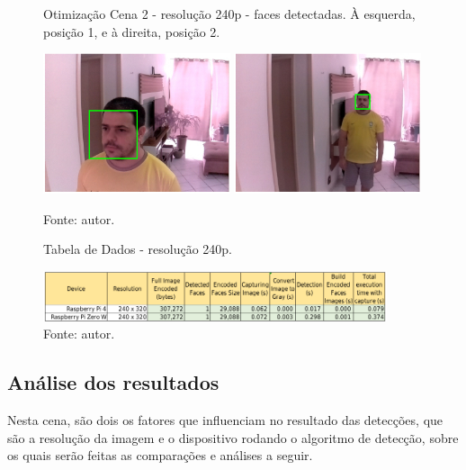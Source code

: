 \begin{figure}[H]
    \centering
    \caption[Otimização Cena 2 - resolução 240p - faces detectadas. À esquerda posição 1 e à direita, posição 2]{Otimização Cena 2 - resolução 240p - faces detectadas. À esquerda, posição 1, e à direita, posição 2.}
    \includegraphics[width=0.49\textwidth]{Cap4_Experimentos_Realizados/Figures/cena2_320x240_pos1_face.jpg}
    \includegraphics[width=0.49\textwidth]{Cap4_Experimentos_Realizados/Figures/cena2_320x240_pos2_face.jpg}
    \caption*{Fonte: autor.}
    \label{fig:otimizacaoCena2_240p_faces}
\end{figure}

\begin{figure}[H]
    \centering
    \caption[Tabela de Dados - resolução 240p.]{Tabela de Dados - resolução 240p.}
    \includegraphics[width=0.90\textwidth]{Cap4_Experimentos_Realizados/Figures/cena2_dados_240p.jpg}
    \caption*{Fonte: autor.}
    \label{fig:dadosCena2_240p}
\end{figure}

\subsection{Análise dos resultados}

Nesta cena, são dois os fatores que influenciam no resultado das detecções, que são a resolução da imagem e o dispositivo rodando o algoritmo de detecção, sobre os quais serão feitas as comparações e análises a seguir.

